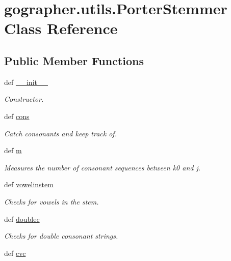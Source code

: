 \hypertarget{classgographer_1_1utils_1_1_porter_stemmer}{\section{gographer.\-utils.\-Porter\-Stemmer Class Reference}
\label{classgographer_1_1utils_1_1_porter_stemmer}
}
\subsection*{Public Member Functions}
\begin{DoxyCompactItemize}
\item 
def \hyperlink{classgographer_1_1utils_1_1_porter_stemmer_a0de90476bde75c491862f5a730d002fb}{\-\_\-\-\_\-init\-\_\-\-\_\-}
\begin{DoxyCompactList}\small\item\em Constructor. \end{DoxyCompactList}\item 
def \hyperlink{classgographer_1_1utils_1_1_porter_stemmer_a3ad494425847ae14773d02685bd27283}{cons}
\begin{DoxyCompactList}\small\item\em Catch consonants and keep track of. \end{DoxyCompactList}\item 
def \hyperlink{classgographer_1_1utils_1_1_porter_stemmer_ae18665be18ba7efa8bcd5aacbf0265a7}{m}
\begin{DoxyCompactList}\small\item\em Measures the number of consonant sequences between k0 and j. \end{DoxyCompactList}\item 
def \hyperlink{classgographer_1_1utils_1_1_porter_stemmer_a5d8f49294f98bfef066083866dd49822}{vowelinstem}
\begin{DoxyCompactList}\small\item\em Checks for vowels in the stem. \end{DoxyCompactList}\item 
def \hyperlink{classgographer_1_1utils_1_1_porter_stemmer_a42b2512c538c08a8799ca289835c00e9}{doublec}
\begin{DoxyCompactList}\small\item\em Checks for double consonant strings. \end{DoxyCompactList}\item 
def \hyperlink{classgographer_1_1utils_1_1_porter_stemmer_a3d741db82dca29c732d4011b5647bcef}{cvc}

\end{DoxyCompactItemize}
